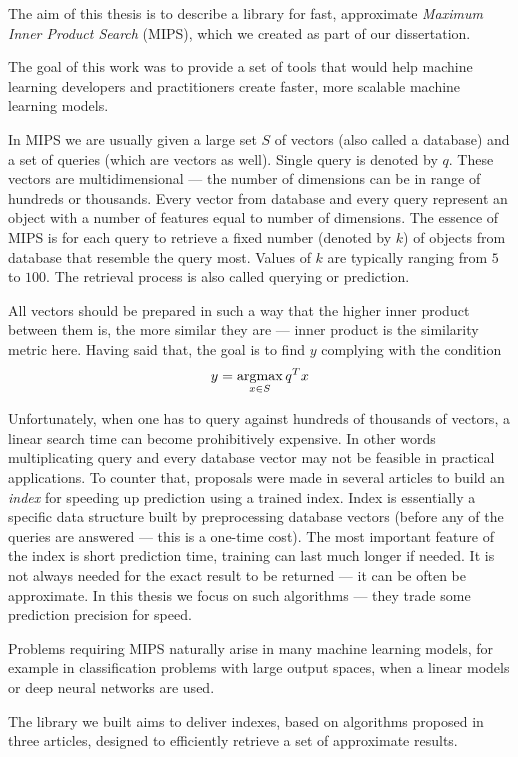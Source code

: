 The aim of this thesis is to describe a library for fast, approximate \textit{Maximum Inner Product Search} (MIPS),
which we created as part of our dissertation. 

The goal of this work was to provide a set of tools that would help machine learning developers and practitioners create faster, 
more scalable machine learning models.

In MIPS we are usually given a large set $S$ of vectors (also called a database) and a set of queries
(which are vectors as well). Single query is denoted by $q$.
These vectors are multidimensional --- the number of dimensions can be in range of hundreds or thousands.
Every vector from database and every query represent an object with a number of features equal to number of dimensions.
The essence of MIPS is for each query to retrieve a fixed number (denoted by $k$)
of objects from database that resemble the query most.
Values of $k$ are typically ranging from $5$ to $100$.
The retrieval process is also called querying or prediction.

All vectors should be prepared in such a way that the higher inner product between them is, the more similar they are
 --- inner product is the similarity metric here. Having said that, the goal is to find $y$ complying with the condition
\[ y = \operatorname*{argmax}_{x \in S} q^T x \]

Unfortunately, when one has to query against hundreds of thousands of vectors,
a linear search time can become prohibitively expensive.
In other words multiplicating query and every database vector may not be feasible in practical applications.
To counter that, proposals were made in several articles to build an \textit{index} for speeding
up prediction using a trained index.
Index is essentially a specific data structure built by preprocessing database vectors (before
any of the queries are answered --- this is a one-time cost).
The most important feature of the index is short prediction time, training can last much longer if needed.
It is not always needed for the exact result to be returned --- it can be often be approximate.
In this thesis we focus on such algorithms --- they trade some prediction precision for speed.

Problems requiring MIPS naturally arise in many machine learning models, for example in
classification problems with large output spaces, when a linear models or deep neural networks are used.

The library we built aims to deliver indexes, based on algorithms proposed in three articles,
designed to efficiently retrieve a set of approximate results.

